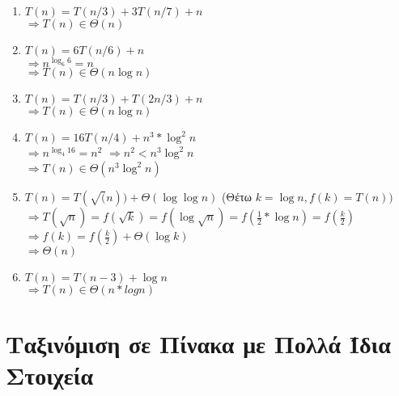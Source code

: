 \documentclass[a4paper,10pt]{article} \usepackage{anysize}
\newcommand{\tab}{\hspace*{3em}}
\begin{document}
\begin{enumerate}
\begin{enumerate}
\item $T(n) = T(n/3) +3T(n/7)+n$\\
$\Rightarrow T(n) \in \Theta(n)$

\item $T(n) = 6T(n/6)+n$\\
$\Rightarrow n^{\log _6 {6}} = n$\\
$\Rightarrow T(n) \in \Theta(n\log {n})$

\item $T(n) = T(n/3) + T(2n/3) + n$\\
$\Rightarrow T(n) \in \Theta(n\log{n})$

\item $T(n) = 16T(n/4) + n^3*\log^2{n}$\\
$\Rightarrow n^{\log _4{16}} = n^2$
$\Rightarrow n^2 < n^3\log^2{n}$\\
$\Rightarrow T(n) \in \Theta(n^3\log^2{n})$

\item $T(n) = T(\sqrt(n)) + \Theta(\log{\log{n}})$ \tab
(Θέτω $k=\log{n}, f(k)=T(n))$\\
$\Rightarrow
T(\sqrt{n})=f(\sqrt{k})=f(\log{\sqrt{n}})=f(\frac{1}{2}*\log{n})=f(\frac{k}{2}) $\\
$\Rightarrow f(k)=f(\frac{k}{2})+\Theta(\log{k})$\\
$\Rightarrow \Theta(n)$

\item $T(n) = T(n-3) + \log{n}$\\
$\Rightarrow T(n) \in \Theta(n*logn)$

\end{enumerate}
\end{enumerate}

\section{Ταξινόμιση σε Πίνακα με Πολλά Ίδια Στοιχεία}


\pagebreak
\end{document}
